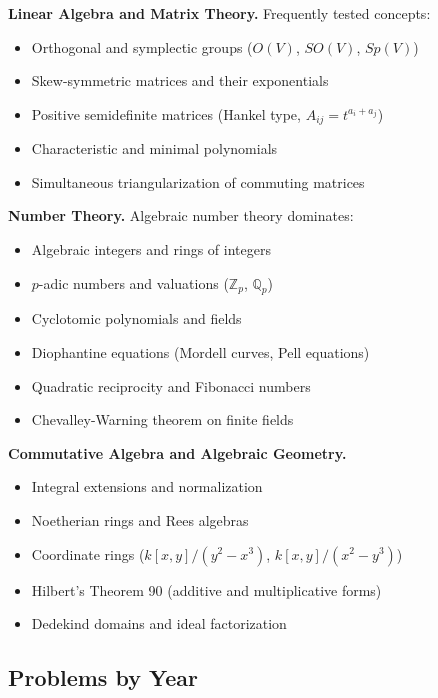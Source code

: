 \medskip
\noindent\textbf{Linear Algebra and Matrix Theory.} Frequently tested concepts:
\begin{itemize}
    \item Orthogonal and symplectic groups ($O(V)$, $SO(V)$, $Sp(V)$)
    \item Skew-symmetric matrices and their exponentials
    \item Positive semidefinite matrices (Hankel type, $A_{ij} = t^{a_i+a_j}$)
    \item Characteristic and minimal polynomials
    \item Simultaneous triangularization of commuting matrices
\end{itemize}

\medskip
\noindent\textbf{Number Theory.} Algebraic number theory dominates:
\begin{itemize}
    \item Algebraic integers and rings of integers
    \item $p$-adic numbers and valuations ($\mathbb{Z}_p$, $\mathbb{Q}_p$)
    \item Cyclotomic polynomials and fields
    \item Diophantine equations (Mordell curves, Pell equations)
    \item Quadratic reciprocity and Fibonacci numbers
    \item Chevalley-Warning theorem on finite fields
\end{itemize}

\medskip
\noindent\textbf{Commutative Algebra and Algebraic Geometry.}
\begin{itemize}
    \item Integral extensions and normalization
    \item Noetherian rings and Rees algebras
    \item Coordinate rings ($k[x,y]/(y^2-x^3)$, $k[x,y]/(x^2-y^3)$)
    \item Hilbert's Theorem 90 (additive and multiplicative forms)
    \item Dedekind domains and ideal factorization
\end{itemize}

\subsection{Problems by Year}

